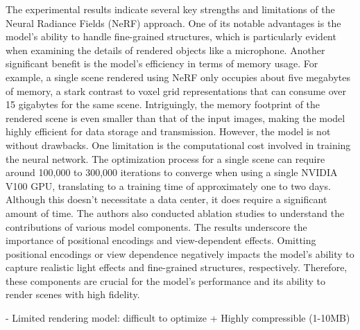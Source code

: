The experimental results indicate several key strengths and limitations of the Neural Radiance Fields (NeRF) approach. One of its notable advantages is the model's ability to handle fine-grained structures, which is particularly evident when examining the details of rendered objects like a microphone. Another significant benefit is the model's efficiency in terms of memory usage. For example, a single scene rendered using NeRF only occupies about five megabytes of memory, a stark contrast to voxel grid representations that can consume over 15 gigabytes for the same scene. Intriguingly, the memory footprint of the rendered scene is even smaller than that of the input images, making the model highly efficient for data storage and transmission. However, the model is not without drawbacks. One limitation is the computational cost involved in training the neural network. The optimization process for a single scene can require around 100,000 to 300,000 iterations to converge when using a single NVIDIA V100 GPU, translating to a training time of approximately one to two days. Although this doesn't necessitate a data center, it does require a significant amount of time. The authors also conducted ablation studies to understand the contributions of various model components. The results underscore the importance of positional encodings and view-dependent effects. Omitting positional encodings or view dependence negatively impacts the model's ability to capture realistic light effects and fine-grained structures, respectively. Therefore, these components are crucial for the model's performance and its ability to render scenes with high fidelity.

- Limited rendering model: difficult to optimize
+ Highly compressible (1-10MB)